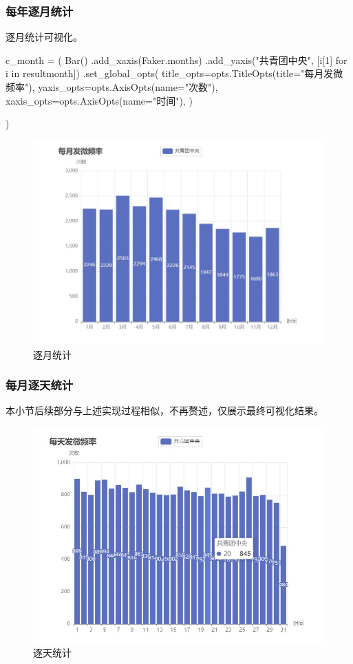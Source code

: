 \subsubsection{每年逐月统计}
逐月统计可视化。
\begin{python}
    c_month = (
        Bar()
        .add_xaxis(Faker.months)
        .add_yaxis("共青团中央", [i[1] for i in resultmonth])
        .set_global_opts(
            title_opts=opts.TitleOpts(title="每月发微频率"),
            yaxis_opts=opts.AxisOpts(name="次数"),
            xaxis_opts=opts.AxisOpts(name="时间"),
        )

    )
\end{python}
\begin{figure}[H]
    \centering
    \includegraphics[width=12cm]{figure/monthfre.jpg}
    \caption{逐月统计} \label{fig:monthfre}
\end{figure} 
\subsubsection{每月逐天统计}
本小节后续部分与上述实现过程相似，不再赘述，仅展示最终可视化结果。
\begin{figure}[H]
    \centering
    \includegraphics[width=12cm]{figure/dayfre.jpg}
    \caption{逐天统计} \label{fig:dayfre}
\end{figure} 

